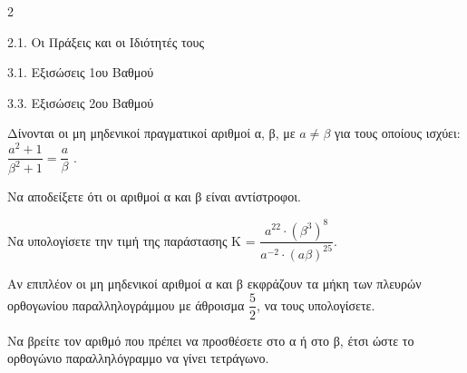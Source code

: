 \begin{ylh}{2}
    \item 2.1. Οι Πράξεις και οι Ιδιότητές τους
    \item 3.1. Εξισώσεις 1ου Βαθμού
    \item 3.3. Εξισώσεις 2ου Βαθμού
\end{ylh}
Δίνονται οι μη μηδενικοί πραγματικοί αριθμοί α, β, με $a \neq \beta$ για τους οποίους ισχύει: $\dfrac{a^{2} + 1}{\beta^{2} + 1} = \dfrac{a}{\beta}$ .
\begin{alist}
\item Να αποδείξετε ότι οι αριθμοί α και β είναι αντίστροφοι.
\item Να υπολογίσετε την τιμή της παράστασης Κ = $\dfrac{a^{22} \cdot \left( \beta^{3} \right)^{8}}{a^{- 2} \cdot (a\beta)^{25}}$.
\item Αν επιπλέον οι μη μηδενικοί αριθμοί α και β εκφράζουν τα μήκη των πλευρών ορθογωνίου παραλληλογράμμου με άθροισμα $\dfrac{5}{2}$, να τους υπολογίσετε.
\item Να βρείτε τον αριθμό που πρέπει να προσθέσετε στο α ή στο β, έτσι ώστε το ορθογώνιο παραλληλόγραμμο να γίνει τετράγωνο.
\end{alist}

